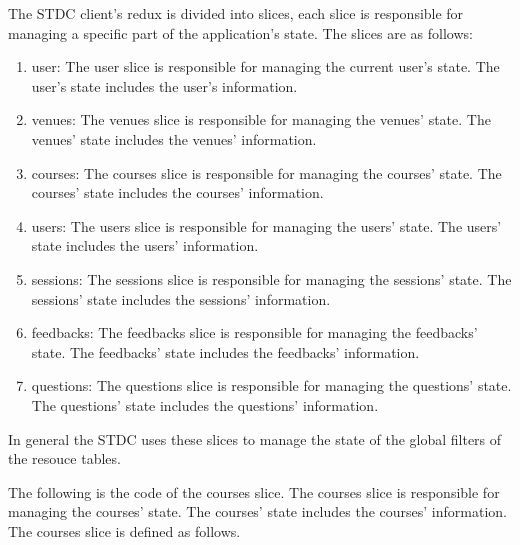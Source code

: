 \begin{justify}
        \vspace{0.25cm}
        \newendline The STDC client's redux is divided into slices, each slice is responsible for managing a specific part of the application's state. The slices are as follows:

        \begin{enumerate}
            \item user: The user slice is responsible for managing the current user's state. The user's state includes the user's information.
            \item venues: The venues slice is responsible for managing the venues' state. The venues' state includes the venues' information.
            \item courses: The courses slice is responsible for managing the courses' state. The courses' state includes the courses' information.
            \item users: The users slice is responsible for managing the users' state. The users' state includes the users' information.
            \item sessions: The sessions slice is responsible for managing the sessions' state. The sessions' state includes the sessions' information.
            \item feedbacks: The feedbacks slice is responsible for managing the feedbacks' state. The feedbacks' state includes the feedbacks' information.
            \item questions: The questions slice is responsible for managing the questions' state. The questions' state includes the questions' information.
        \end{enumerate}

        \vspace{0.25cm}
        \newendline In general the STDC uses these slices to manage the state of the global filters of the resouce tables.
    
        \vspace{0.25cm}
        \newendline The following is the code of the courses slice. The courses slice is responsible for managing the courses' state. The courses' state includes the courses' information. The courses slice is defined as follows.


\end{justify}
